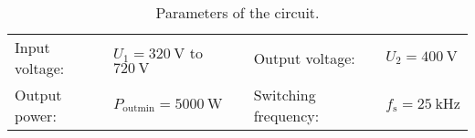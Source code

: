 \begin{table}[ht]
    \centering  %
    \begin{tabular}{llll}
        \toprule
        
        Input voltage: &  $U_{\mathrm{1}} = \SI{320}{\volt}$ to $\SI{720}{\volt}$ & Output voltage: & $U_{\mathrm{2}} = \SI{400}{\volt}$ \\ 
        Output power: & $P_{\mathrm{outmin}} = \SI{5000}{\watt}$ & Switching frequency: & $f_{\mathrm{s}} = \SI{25}{\kilo\hertz}$ \\ 
        \bottomrule
    \end{tabular}
    \caption{Parameters of the circuit.}  %
    \label{table:Parameters of the buck-boost converter}
\end{table}